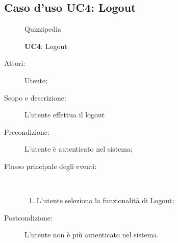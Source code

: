 \subsection{Caso d'uso UC4: Logout}
	\begin{figure}[H]
		\centering
		\begin{resizedtikzpicture}{\textwidth}
		\begin{umlsystem}[x=0, fill=lightgray!20]{Quizzipedia}
		\end{umlsystem}
		\end{resizedtikzpicture}
		\caption{\textbf{UC4}: Logout}
		\label{UC4}
	\end{figure}
\begin{description}
\item[Attori:] Utente;
\item[Scopo e descrizione:] L'utente effettua il logout
      \item[Precondizione:] L'utente è autenticato nel sistema;

        \item[Flusso principale degli eventi:] \ 
 \begin{enumerate}
          \item L'utente seleziona la funzionalità di Logout;

      \end{enumerate}
    \item[Postcondizione:] L'utente non è più autenticato nel sistema.
  \end{description}
\hypertarget{UC5}{}

